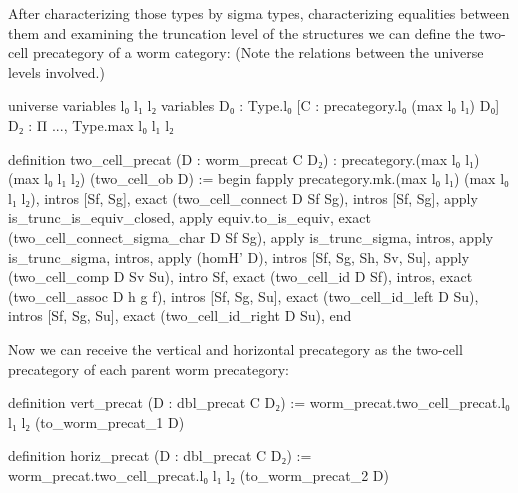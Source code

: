 After characterizing those types by sigma types, characterizing equalities between
them and examining the truncation level of the structures we can define the
two-cell precategory of a worm category: (Note the relations between the universe
levels involved.)
\begin{leancodebr}
universe variables l₀ l₁ l₂
variables {D₀ : Type.{l₀}} [C : precategory.{l₀ (max l₀ l₁)} D₀]
  {D₂ : Π ..., Type.{max l₀ l₁ l₂}}

definition two_cell_precat (D : worm_precat C D₂)
  : precategory.{(max l₀ l₁) (max l₀ l₁ l₂)} (two_cell_ob D) :=
begin
  fapply precategory.mk.{(max l₀ l₁) (max l₀ l₁ l₂)},
    intros [Sf, Sg], exact (two_cell_connect D Sf Sg),
    intros [Sf, Sg], apply is_trunc_is_equiv_closed, apply equiv.to_is_equiv,
      exact (two_cell_connect_sigma_char D Sf Sg),
      apply is_trunc_sigma, intros,
      apply is_trunc_sigma, intros, apply (homH' D),
    intros [Sf, Sg, Sh, Sv, Su], apply (two_cell_comp D Sv Su),
    intro Sf, exact (two_cell_id D Sf),
    intros, exact (two_cell_assoc D h g f),
    intros [Sf, Sg, Su], exact (two_cell_id_left D Su),
    intros [Sf, Sg, Su], exact (two_cell_id_right D Su),
end
\end{leancodebr}

Now we can receive the vertical and horizontal precategory as the two-cell
precategory of each parent worm precategory:
\begin{leancode}
definition vert_precat (D : dbl_precat C D₂) :=
worm_precat.two_cell_precat.{l₀ l₁ l₂} (to_worm_precat_1 D)

definition horiz_precat (D : dbl_precat C D₂) :=
worm_precat.two_cell_precat.{l₀ l₁ l₂} (to_worm_precat_2 D)
\end{leancode}

